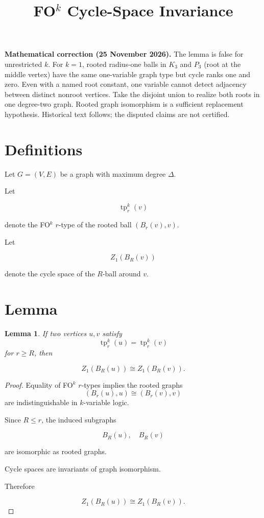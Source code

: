 \documentclass{article}
\newtheorem{lemma}{Lemma}
\begin{document}
\title{FO$^k$ Cycle-Space Invariance}
\date{}
\maketitle
\par\noindent\textbf{Mathematical correction (25 November 2026).} The lemma is false for unrestricted $k$. For $k=1$, rooted radius-one balls in $K_3$ and $P_3$ (root at the middle vertex) have the same one-variable graph type but cycle ranks one and zero. Even with a named root constant, one variable cannot detect adjacency between distinct nonroot vertices. Take the disjoint union to realize both roots in one degree-two graph. Rooted graph isomorphism is a sufficient replacement hypothesis. Historical text follows; the disputed claims are not certified.\par


\section*{Definitions}

Let $G=(V,E)$ be a graph with maximum degree $\Delta$.

Let

\[
\operatorname{tp}^k_r(v)
\]

denote the FO$^k$ $r$-type of the rooted ball $(B_r(v),v)$.

Let

\[
Z_1(B_R(v))
\]

denote the cycle space of the $R$-ball around $v$.

\section*{Lemma}

\begin{lemma}
If two vertices $u,v$ satisfy
\[
\operatorname{tp}^k_r(u)=\operatorname{tp}^k_r(v)
\]
for $r\ge R$, then

\[
Z_1(B_R(u)) \cong Z_1(B_R(v)).
\]
\end{lemma}

\begin{proof}

Equality of FO$^k$ $r$-types implies the rooted graphs
\[
(B_r(u),u) \cong (B_r(v),v)
\]
are indistinguishable in $k$-variable logic.

Since $R\le r$, the induced subgraphs

\[
B_R(u),\quad B_R(v)
\]

are isomorphic as rooted graphs.

Cycle spaces are invariants of graph isomorphism.

Therefore

\[
Z_1(B_R(u)) \cong Z_1(B_R(v)).
\]

\end{proof}
\end{document}
